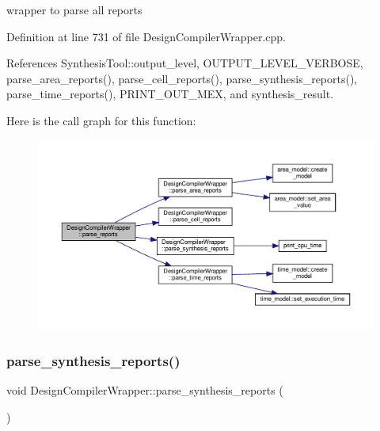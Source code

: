 wrapper to parse all reports 



Definition at line 731 of file Design\+Compiler\+Wrapper.\+cpp.



References Synthesis\+Tool\+::output\+\_\+level, O\+U\+T\+P\+U\+T\+\_\+\+L\+E\+V\+E\+L\+\_\+\+V\+E\+R\+B\+O\+SE, parse\+\_\+area\+\_\+reports(), parse\+\_\+cell\+\_\+reports(), parse\+\_\+synthesis\+\_\+reports(), parse\+\_\+time\+\_\+reports(), P\+R\+I\+N\+T\+\_\+\+O\+U\+T\+\_\+\+M\+EX, and synthesis\+\_\+result.

Here is the call graph for this function\+:
\nopagebreak
\begin{figure}[H]
\begin{center}
\leavevmode
\includegraphics[width=350pt]{d5/d55/classDesignCompilerWrapper_a7a64611e48e20a4cf7f3dc3e6f4fcfcd_cgraph}
\end{center}
\end{figure}
\mbox{\label{classDesignCompilerWrapper_a251f045b7fa693969e0a867f3751f8a5}} 
\subsubsection{\texorpdfstring{parse\+\_\+synthesis\+\_\+reports()}{parse\_synthesis\_reports()}}
{\footnotesize\ttfamily void Design\+Compiler\+Wrapper\+::parse\+\_\+synthesis\+\_\+reports (\begin{DoxyParamCaption}{ }\end{DoxyParamCaption})\hspace{0.3cm}{\ttfamily [protected]}}



